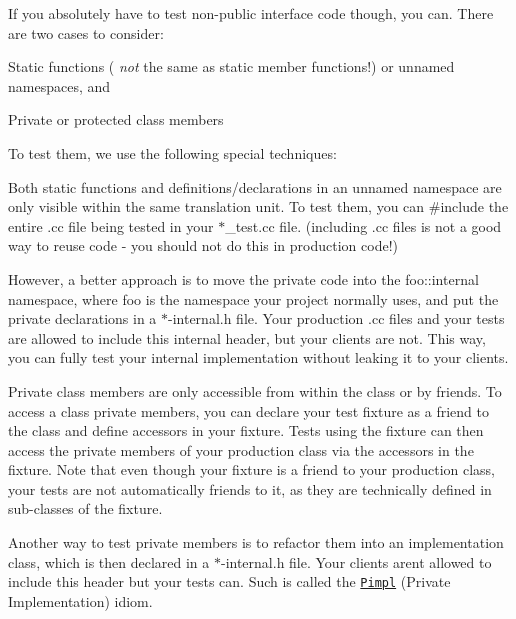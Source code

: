 If you absolutely have to test non-\/public interface code though, you can. There are two cases to consider\+:


\begin{DoxyItemize}
\item Static functions ( {\itshape not} the same as static member functions!) or unnamed namespaces, and
\item Private or protected class members
\end{DoxyItemize}

To test them, we use the following special techniques\+:


\begin{DoxyItemize}
\item Both static functions and definitions/declarations in an unnamed namespace are only visible within the same translation unit. To test them, you can {\ttfamily \#include} the entire {\ttfamily .cc} file being tested in your {\ttfamily $\ast$\+\_\+test.cc} file. (including {\ttfamily .cc} files is not a good way to reuse code -\/ you should not do this in production code!)

However, a better approach is to move the private code into the {\ttfamily foo\+::internal} namespace, where {\ttfamily foo} is the namespace your project normally uses, and put the private declarations in a {\ttfamily $\ast$-\/internal.h} file. Your production {\ttfamily .cc} files and your tests are allowed to include this internal header, but your clients are not. This way, you can fully test your internal implementation without leaking it to your clients.
\item Private class members are only accessible from within the class or by friends. To access a class\textquotesingle{} private members, you can declare your test fixture as a friend to the class and define accessors in your fixture. Tests using the fixture can then access the private members of your production class via the accessors in the fixture. Note that even though your fixture is a friend to your production class, your tests are not automatically friends to it, as they are technically defined in sub-\/classes of the fixture.

Another way to test private members is to refactor them into an implementation class, which is then declared in a {\ttfamily $\ast$-\/internal.h} file. Your clients aren\textquotesingle{}t allowed to include this header but your tests can. Such is called the \href{https://www.gamedev.net/articles/programming/general-and-gameplay-programming/the-c-pimpl-r1794/}{\tt Pimpl} (Private Implementation) idiom.


\end{DoxyItemize}
